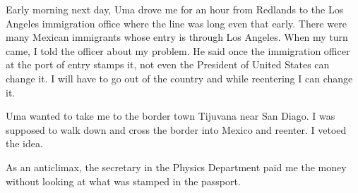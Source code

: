 Early morning next day, Uma drove me for an hour from Redlands to the 
Los Angeles immigration office where the line was long even that early. 
There were many Mexican immigrants whose entry is through Los Angeles. 
When my turn came, I told the officer about my problem. He said once the 
immigration offi\-cer at the port of entry stamps it, not even the 
President of United States can change it. I will have to go out of the 
country and while reentering I can change it.

Uma wanted to take me to the border town Tijuvana near San Diago. I was 
supposed to walk down and cross the border into Mexico and reenter. I 
vetoed the idea.

As an anticlimax, the secretary in the Physics Department paid me the 
money without looking at what was stamped in the passport.

